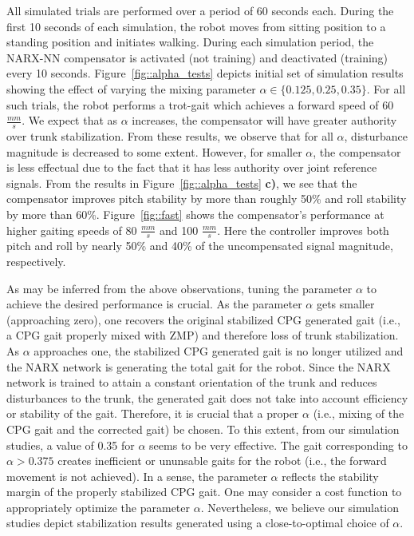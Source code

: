 All simulated trials are performed over a period of 60 seconds each. During the first 10 seconds of each simulation, the robot moves from sitting position to a standing position and initiates walking. During each simulation period, the NARX-NN compensator is activated (not training)  and deactivated (training)  every 10 seconds. Figure~\ref{fig::alpha_tests} depicts initial set of simulation results showing the effect of varying the mixing parameter $\alpha\in\{0.125, 0.25, 0.35\}$. For all such trials, the robot performs a trot-gait which achieves a forward speed of 60 $\frac{mm}{s}$. We expect that as $\alpha$ increases, the compensator will have greater authority over trunk stabilization. From these results, we observe that for all $\alpha$, disturbance magnitude is decreased to some extent. However, for smaller $\alpha$, the compensator is less effectual due to the fact that it has less authority over joint reference signals.  From the results in Figure~\ref{fig::alpha_tests} \textbf{c)}, we see that the compensator improves pitch stability by more than roughly 50\% and roll stability by more than 60\%. Figure~\ref{fig::fast} shows the compensator's performance at higher gaiting speeds of 80 $\frac{mm}{s}$ and 100 $\frac{mm}{s}$. Here the controller improves both pitch and roll by nearly 50\% and 40\% of the  uncompensated signal magnitude, respectively.

As may be inferred from the above observations, tuning the parameter $\alpha$ to achieve the desired performance is crucial. As the parameter $\alpha$ gets smaller (approaching zero), one recovers the original stabilized CPG generated gait (i.e., a CPG gait properly mixed with ZMP) and therefore loss of trunk stabilization. As $\alpha$ approaches one, the stabilized CPG generated gait is no longer utilized and the NARX network is generating the total gait for the robot. Since the NARX network is trained to attain a constant orientation of the trunk and reduces disturbances to the trunk, the generated gait does not take into account efficiency or  stability of the gait. Therefore, it is crucial that a proper $\alpha$ (i.e., mixing of the CPG gait and the corrected gait) be chosen. To this extent, from our simulation studies, a value of 0.35 for $\alpha$ seems to be very effective. The gait corresponding to $\alpha > 0.375$ creates inefficient or ununsable gaits for the robot (i.e., the forward movement is not achieved). In a sense, the parameter $\alpha$ reflects the stability margin of the properly stabilized CPG gait. One may consider a cost function to appropriately optimize the parameter $\alpha$. Nevertheless, we believe our simulation studies depict stabilization results generated using a close-to-optimal choice of $\alpha$.

